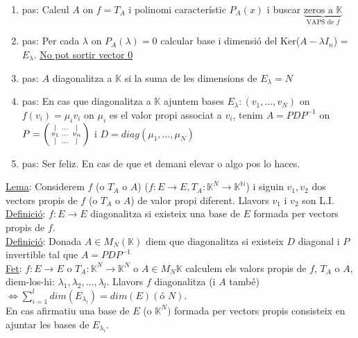 \documentclass[../main.tex]{subfiles}
\begin{document}
    \begin{enumerate}
        \item pas: Calcul $A$ on $f = T_A$ i polinomi característic $P_A(x)$ i buscar $\underbrace{\text{zeros a }\mathbb{K}}_{\text{VAPS de }f}$
        \item pas: Per cada $\lambda$ on $P_A(\lambda) = 0$ calcular base i dimensió del Ker($A - \lambda I_n$) = $E_\lambda$. \underline{No pot sortir vector 0}
        \item pas: $A$ diagonalitza a $\mathbb{K}$ si la suma de les dimensions de $E_\lambda = N$
        \item pas: En cas que diagonalitza a $\mathbb{K}$ ajuntem bases $E_\lambda: (v_1, \dots, v_N)$ on $f(v_i) = \mu_i v_i$ on $\mu_i$ es el valor propi associat a $v_i$, tenim $A=PDP^{-1}$ on $P = \begin{psmallmatrix} | & \dots & |\\ v_1 & \dots & v_n\\ | & \dots & | \end{psmallmatrix}$ i $D = diag(\mu_1, \dots, \mu_N)$
        \item pas: Ser feliz. En cas de que et demani elevar o algo pos lo haces. 
    \end{enumerate}
    \underline{Lema}: Considerem $f$ (o $T_A$ o $A$) ($f: E \rightarrow E, T_A: \mathbb{K}^N \rightarrow \mathbb{K^N}$) i siguin $v_1, v_2$ dos vectors propis de $f$ (o $T_A$ o $A$) de valor propi diferent. Llavors $v_1$ i $v_2$ son L.I.\\
    \underline{Definició}: $f: E \rightarrow E$ diagonalitza si existeix una base de $E$ formada per vectors propis de $f$.\\
    \underline{Definició}: Donada $A \in M_N(\mathbb{K})$ diem que diagonalitza si existeix $D$ diagonal i $P$ invertible tal que $A = PDP^{-1}$\\
    \underline{Fet}: $f: E \rightarrow E$ o $T_A: \mathbb{K}^N \rightarrow \mathbb{K}^N$ o $A\in M_N{\mathbb{K}}$ calculem els valors propis de $f$, $T_A$ o $A$, diem-los-hi: $\lambda_1, \lambda_2, \dots, \lambda_l$. Llavors $f$ diagonalitza (i $A$ també) $\Longleftrightarrow \sum\limits_{i=1}^l dim(E_{\lambda_i}) = dim(E) (\text{ó } N)$.\\
    En cas afirmatiu una base de $E$ (o $\mathbb{K}^N)$ formada per vectors propis consisteix en ajuntar les bases de $E_{\lambda_i}$.\\
\end{document}
